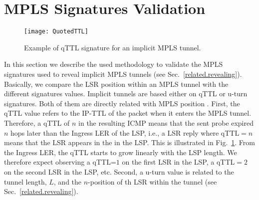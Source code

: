 \section{MPLS Signatures Validation}\label{validation}
\begin{figure}[!t]
  \begin{center}
    \texttt{[image: QuotedTTL]}
  \end{center}
  \caption{Example of qTTL signature for an implicit MPLS tunnel.}
  \label{validation.qTTLFig}
\end{figure}


In this section we describe the used methodology to validate the MPLS signatures
used to reveal implicit MPLS tunnels (see Sec.~\ref{related.revealing}).
Basically, we compare the LSR position within an MPLS tunnel with the different
signatures values. Implicit tunnels are based either on qTTL or u-turn
signatures. Both of them are directly related with MPLS position .
First, the qTTL value refers to the IP-TTL of the \echorequest packet when it
enters the MPLS tunnel.  Therefore, a qTTL of $n$ in the resulting ICMP
\ttlexceeded means that the sent probe expired $n$ hops later than the Ingress
LER of the LSP, i.e., a LSR reply where qTTL$=n$ means that the LSR appears in
the  in the LSP.  This is illustrated in
Fig.~\ref{validation.qTTLFig}.  From the Ingress LER, the qTTL starts to grow
linearly with the LSP length.  We therefore expect observing a qTTL=$1$ on the
first LSR in the LSP, a qTTL$=2$ on the second LSR in the LSP, etc.  Second, a
u-turn value is related to the tunnel length, $L$, and the $n$-position of th
LSR within the tunnel (see Sec.~\ref{related.revealing}).


